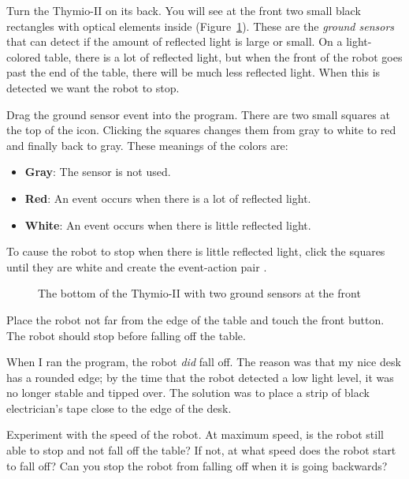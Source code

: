 
Turn the Thymio-II on its back. You will see at the front two small
black rectangles with optical elements inside (Figure~\ref{fig.bottom}).
These are the \emph{ground sensors} that can detect if the amount of
reflected light is large or small. On a light-colored table, there is a
lot of reflected light, but when the front of the robot goes past the
end of the table, there will be much less reflected light. When this is
detected we want the robot to stop.


Drag the ground sensor event  into the program. There
are two small squares at the top of the icon. Clicking the squares
changes them from gray to white to red and finally back to gray. These
meanings of the colors are:

\begin{itemize}
\item \textbf{Gray}: The sensor is not used.
\item \textbf{Red}: An event occurs when there is a lot of reflected light.
\item \textbf{White}: An event occurs when there is little reflected light.
\end{itemize}

To cause the robot to stop when there is little reflected light, click
the squares until they are white and create the event-action pair
.

\begin{figure}
\begin{center}
\caption{The bottom of the Thymio-II with two ground sensors at the
 front}\label{fig.bottom}
\end{center}
\end{figure}

Place the robot not far from the edge of the table and touch the front
button. The robot should stop before falling off the table.

When I ran the program, the robot \emph{did} fall off. The reason was
that my nice desk has a rounded edge; by the time that the robot
detected a low light level, it was no longer stable and tipped over. The
solution was to place a strip of black electrician's tape close to the
edge of the desk.


Experiment with the speed of the robot. At maximum speed, is the robot
still able to stop and not fall off the table? If not, at what speed
does the robot start to fall off? Can you stop the robot from falling
off when it is going backwards?
